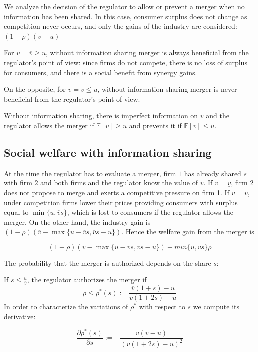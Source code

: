 \documentclass[a4paper,leqno]{article}%
\newcommand{\E}{\mathbb E}
\newcommand{\uv}{\underline{v}}
\newcommand{\ov}{\overline{v}}
\begin{document}
We analyze the decision of the regulator to allow or prevent a merger when no information has been shared. In this case, consumer surplus does not change as competition never occurs, and only the gains of the industry are considered: $(1-\rho) (v-u)$

For $v=\ov\geq u$, without information sharing merger is always beneficial from the regulator's point of view: since firms do not compete, there is no loss of surplus for consumers, and there is a social benefit from synergy gains.

On the opposite, for $v=\uv\leq u$, without information sharing merger is never beneficial from the regulator's point of view.

Without information sharing, there is imperfect information on $v$ and the regulator allows the merger if $\E[v]\geq u$ and prevents it if $\E[v]\leq u$.

\medskip

\subsection{Social welfare with information sharing}

\medskip

At the time the regulator has to evaluate a merger, firm $1$ has already shared $s$ with firm $2$ and both firms and the regulator know the value of $v$. If $v=\uv$, firm 2 does not propose to merge and exerts a competitive pressure on firm 1. If $v=\ov$, under competition firms lower their prices providing consumers with surplus equal to $\min\{u,\ov s\}$, which is lost to consumers if the regulator allows the merger. On the other hand, the industry gain is $(1-\rho) (\ov-\max\{u-\ov s,\ov s-u\})$. Hence the welfare gain from the merger is

%

\[
(1-\rho) (\ov-\max\{u-\ov s,\ov s-u\})-min\{u,\ov s\}\rho
\]

The probability that the merger is authorized depends on the share $s$: 

If $s\leq \frac{u}{\ov}$, the regulator authorizes the merger if
    \begin{equation}
           \rho\leq \rho^*(s):=\frac{\ov(1+s)-u}{\ov(1+2s)-u}
    \end{equation}
In order to characterize the variations of $\rho^*$ with respect to $s$ we compute its derivative:

\[
\frac{\partial \rho^{*}(s)}{\partial s}:=-\frac{\ov(\ov-u)}{(\ov(1+2s)-u)^2}
\]
    
\end{document}
